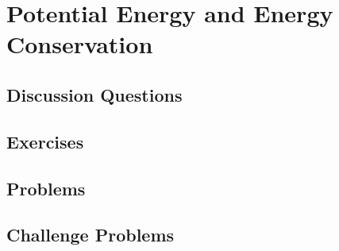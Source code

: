 
\chapter{Potential Energy and Energy Conservation}

\section{Discussion Questions}

\section{Exercises}

\section{Problems}

\section{Challenge Problems}
